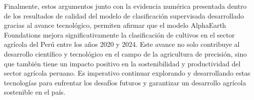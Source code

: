 Finalmente, estos argumentos junto con la evidencia numérica presentada dentro de los resultados de calidad del modelo de clasificación supervisada desarrollado gracias al avance tecnológico, permiten afirmar que el modelo AlphaEarth Foundations mejora significativamente la clasificación de cultivos en el sector agrícola del Perú entre los años 2020 y 2024. Este avance no solo contribuye al desarrollo científico y tecnológico en el campo de la agricultura de precisión, sino que también tiene un impacto positivo en la sostenibilidad y productividad del sector agrícola peruano. Es imperativo continuar explorando y desarrollando estas tecnologías para enfrentar los desafíos futuros y garantizar un desarrollo agrícola sostenible en el país.